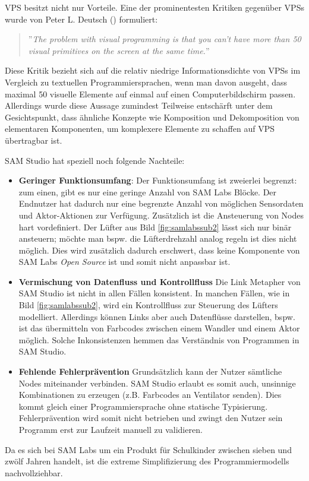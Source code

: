 \ac{VPS} besitzt nicht nur Vorteile. Eine der prominentesten Kritiken gegenüber \acp{VPS} wurde von Peter L. Deutsch (\cite{MASON201368}) formuliert:

\begin{quote}
    ''\textit{The problem with visual programming is that you can’t have more than 50 visual primitives on the screen at the same time.}''
\end{quote}


Diese Kritik bezieht sich auf die relativ niedrige Informationsdichte von \acp{VPS} im Vergleich zu textuellen Programmiersprachen, wenn man davon ausgeht, dass maximal 50 visuelle Elemente auf einmal auf einen Computerbildschirm passen. Allerdings wurde diese Aussage zumindest Teilweise entschärft unter dem Gesichtspunkt, dass ähnliche Konzepte wie Komposition und Dekomposition von elementaren Komponenten, um komplexere Elemente zu schaffen auf \ac{VPS} übertragbar ist.

SAM Studio hat speziell noch folgende Nachteile:
\begin{itemize}
    \item \textbf{Geringer Funktionsumfang}: Der Funktionsumfang ist zweierlei begrenzt: zum einen, gibt es nur eine geringe Anzahl von SAM Labs Blöcke. Der Endnutzer hat dadurch nur eine begrenzte Anzahl von möglichen Sensordaten und Aktor-Aktionen zur Verfügung. Zusätzlich ist die Ansteuerung von Nodes hart vordefiniert. Der Lüfter aus Bild \ref{fig:samlabssub2} lässt sich nur binär ansteuern; möchte man bspw. die Lüfterdrehzahl analog regeln ist dies nicht möglich. Dies wird zusätzlich dadurch erschwert, dass keine Komponente von SAM Labs \textit{Open Source} ist und somit nicht anpassbar ist.
    \item \textbf{Vermischung von Datenfluss und Kontrollfluss} Die Link Metapher von SAM Studio ist nicht in allen Fällen konsistent. In manchen Fällen, wie in Bild \ref{fig:samlabssub2}, wird ein Kontrollfluss zur Steuerung des Lüfters modelliert. Allerdings können Links aber auch Datenflüsse darstellen, bspw. ist das übermitteln von Farbcodes zwischen einem Wandler und einem Aktor möglich. Solche Inkonsistenzen hemmen das Verständnis von Programmen in SAM Studio.
    \item \textbf{Fehlende Fehlerprävention} Grundsätzlich kann der Nutzer sämtliche Nodes miteinander verbinden. SAM Studio erlaubt es somit auch, unsinnige Kombinationen zu erzeugen (z.B. Farbcodes an Ventilator senden). Dies kommt gleich einer Programmiersprache ohne statische Typisierung. Fehlerprävention wird somit nicht betrieben und zwingt den Nutzer sein Programm erst zur Laufzeit manuell zu validieren.
\end{itemize}
Da es sich bei SAM Labs um ein Produkt für Schulkinder zwischen sieben und zwölf Jahren handelt, ist die extreme Simplifizierung des Programmiermodells nachvollziehbar. 

